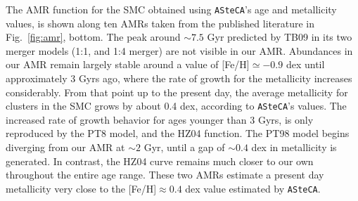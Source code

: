 \documentclass[draft]{aa}
\begin{document}
%
The AMR function for the SMC obtained using \texttt{ASteCA}'s age and
metallicity values, is shown along ten AMRs taken from the published literature
in Fig.~\ref{fig:amr}, bottom.
%
%
The peak around ${\sim}7.5$ Gyr predicted by TB09 in its two merger models 
(1:1, and 1:4 merger) are not visible in our AMR.\@
%
Abundances in our AMR remain largely stable around a value of
[Fe/H]${\simeq-}0.9$ dex until approximately 3 Gyrs ago, where the rate of
growth for the metallicity increases considerably. From that point up to the
present day, the average metallicity for clusters in the SMC grows by about 0.4
dex, according to \texttt{ASteCA}'s values.
%
The increased rate of growth behavior for ages younger than 3 Gyrs, is only
reproduced by the PT8 model, and the HZ04 function.
The PT98 model begins diverging from our AMR at ${\sim}2$ Gyr, until a gap of
${\sim}0.4$ dex in metallicity is generated. In contrast, the HZ04 curve remains
much closer to our own throughout the entire age range. These two AMRs estimate
a present day metallicity very close to the [Fe/H]${\approx}0.4$ dex value
estimated by \texttt{ASteCA}.

\end{document}
